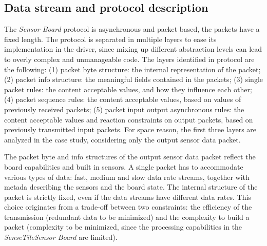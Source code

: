 \documentclass{article}
\newcommand{\ST}{\emph{SenseTile}\xspace}
\newcommand{\SB}{\emph{Sensor Board}\xspace}
\newcommand{\STSB}{\ST \SB\xspace}
\begin{document}
\subsection{Data stream and protocol description}
\label{subsec:data_stream_and_protocol_description}

The \SB protocol is asynchronous and packet based, the packets have a fixed length.  
The protocol is separated in multiple layers to ease its implementation in the driver, since mixing up different abstraction levels can lead to overly complex and unmanageable code.  
The layers identified in protocol are the following: (1) packet byte structure: the internal representation of the packet; (2) packet info structure: the meaningful fields contained in the packets; (3) single packet rules: the content acceptable values, and how they influence each other; (4) packet sequence rules: the content acceptable values, based on values of previously received packets; (5) packet input output asynchronous rules: the content acceptable values and reaction constraints on output packets, based on previously transmitted input packets.
For space reason, the first three layers are analyzed in the case study, considering only the output sensor data packet.

The packet byte and info structures of the output sensor data packet reflect the board capabilities and built in sensors. 
A single packet has to accommodate various types of data: fast, medium and slow data rate streams, together with metada describing the sensors and the board state.
The internal structure of the packet is strictly fixed, even if the data streams have different data rates. 
This choice originates from a trade-off between two constraints: the efficiency of the transmission (redundant data to be minimized) and the complexity to build a packet (complexity to be minimized, since the processing capabilities in the \STSB are limited). 
\end{document}
